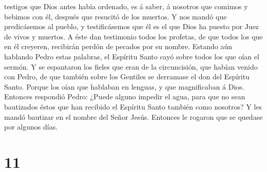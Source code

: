 testigos que Dios antes había ordenado, es á saber, á nosotros que
comimos y bebimos con él, después que resucitó de los muertos.
 Y nos mandó que predicásemos al pueblo, y testificásemos
que él es el que Dios ha puesto por Juez de vivos y muertos.
 A éste dan testimonio todos los profetas, de que todos
los que en él creyeren, recibirán perdón de pecados por su nombre.
 Estando aún hablando Pedro estas palabras, el Espíritu
Santo cayó sobre todos los que oían el sermón.  Y se
espantaron los fieles que eran de la circuncisión, que habían venido con
Pedro, de que también sobre los Gentiles se derramase el don del
Espíritu Santo.  Porque los oían que hablaban en lenguas,
y que magnificaban á Dios.  Entonces respondió Pedro:
¿Puede alguno impedir el agua, para que no sean bautizados éstos que han
recibido el Espíritu Santo también como nosotros?  Y les
mandó bautizar en el nombre del Señor Jesús. Entonces le rogaron que se
quedase por algunos días.

\hypertarget{section-10}{%
\section{11}\label{section-10}}


